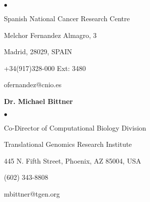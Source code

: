 \documentclass[12pt, centered, centered]{res_yy}
\newenvironment{list1}{
  \begin{list}{\ding{113}}{%
      \setlength{\itemsep}{0in}
      \setlength{\parsep}{0in} \setlength{\parskip}{0in}
      \setlength{\topsep}{0in} \setlength{\partopsep}{0in} 
      \setlength{\leftmargin}{0.17in}}}{\end{list}}
\newenvironment{list2}{
  \begin{list}{$\bullet$}{%
      \setlength{\itemsep}{0in}
      \setlength{\parsep}{0in} \setlength{\parskip}{0in}
      \setlength{\topsep}{0in} \setlength{\partopsep}{0in} 
      \setlength{\leftmargin}{0.2in}}}{\end{list}}
\begin{document}
\begin{resume}
\begin{list1}
\begin{list2}
\item[] Spanish National Cancer Research Centre
\item[] Melchor Fernandez Almagro, 3
\item[] Madrid, 28029, SPAIN
\item[] +34(917)328-000 Ext: 3480
\item[] ofernandez@cnio.es
\end{list2}
\vspace{.1in}
\item[] \textbf{Dr. Michael Bittner}       
\begin{list2} 		
\item[] Co-Director of Computational Biology Division
\item[] Translational Genomics Research Institute
\item[] 445 N. Fifth Street, Phoenix, AZ 85004, USA 
\item[] (602) 343-8808
\item[] mbittner@tgen.org
\end{list2}
\vspace{.1in}
%
\end{list1}

\end{resume}
\end{document}
